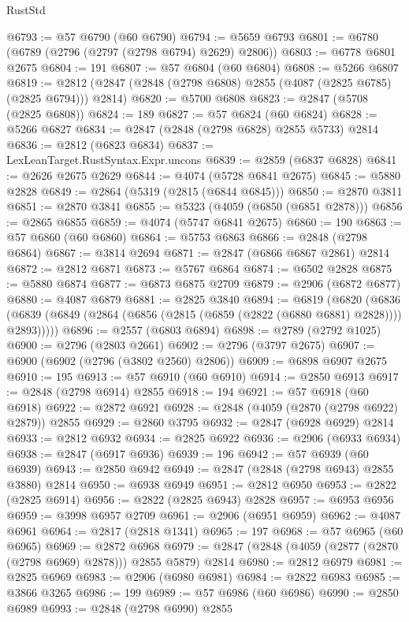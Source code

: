 \begin{lexlean}{RustStd}
\begin{coremodule}
@6793 := @57 @6790 (@60 @6790)
@6794 := @5659 @6793
@6801 := @6780 (@6789 (@2796 (@2797 (@2798 @6794) @2629) @2806))
@6803 := @6778 @6801 @2675
@6804 := 191
@6807 := @57 @6804 (@60 @6804)
@6808 := @5266 @6807
@6819 := @2812 (@2847 (@2848 (@2798 @6808) @2855 (@4087 (@2825 @6785) (@2825 @6794))) @2814)
@6820 := @5700 @6808
@6823 := @2847 (@5708 (@2825 @6808))
@6824 := 189
@6827 := @57 @6824 (@60 @6824)
@6828 := @5266 @6827
@6834 := @2847 (@2848 (@2798 @6828) @2855 @5733) @2814
@6836 := @2812 (@6823 @6834)
@6837 := LexLeanTarget.RustSyntax.Expr.uncons
@6839 := @2859 (@6837 @6828)
@6841 := @2626 @2675 @2629
@6844 := @4074 (@5728 @6841 @2675)
@6845 := @5880 @2828
@6849 := @2864 (@5319 (@2815 (@6844 @6845)))
@6850 := @2870 @3811
@6851 := @2870 @3841
@6855 := @5323 (@4059 (@6850 (@6851 @2878)))
@6856 := @2865 @6855
@6859 := @4074 (@5747 @6841 @2675)
@6860 := 190
@6863 := @57 @6860 (@60 @6860)
@6864 := @5753 @6863
@6866 := @2848 (@2798 @6864)
@6867 := @3814 @2694
@6871 := @2847 (@6866 @6867 @2861) @2814
@6872 := @2812 @6871
@6873 := @5767 @6864
@6874 := @6502 @2828
@6875 := @5880 @6874
@6877 := @6873 @6875 @2709
@6879 := @2906 (@6872 @6877)
@6880 := @4087 @6879
@6881 := @2825 @3840
@6894 := @6819
    (@6820
      (@6836 (@6839 (@6849 (@2864 (@6856 (@2815 (@6859 (@2822 (@6880 @6881) @2828)))) @2893)))))
@6896 := @2557 (@6803 @6894)
@6898 := @2789 (@2792 @1025)
@6900 := @2796 (@2803 @2661)
@6902 := @2796 (@3797 @2675)
@6907 := @6900 (@6902 (@2796 (@3802 @2560) @2806))
@6909 := @6898 @6907 @2675
@6910 := 195
@6913 := @57 @6910 (@60 @6910)
@6914 := @2850 @6913
@6917 := @2848 (@2798 @6914) @2855
@6918 := 194
@6921 := @57 @6918 (@60 @6918)
@6922 := @2872 @6921
@6928 := @2848 (@4059 (@2870 (@2798 @6922) @2879)) @2855
@6929 := @2860 @3795
@6932 := @2847 (@6928 @6929) @2814
@6933 := @2812 @6932
@6934 := @2825 @6922
@6936 := @2906 (@6933 @6934)
@6938 := @2847 (@6917 @6936)
@6939 := 196
@6942 := @57 @6939 (@60 @6939)
@6943 := @2850 @6942
@6949 := @2847 (@2848 (@2798 @6943) @2855 @3880) @2814
@6950 := @6938 @6949
@6951 := @2812 @6950
@6953 := @2822 (@2825 @6914)
@6956 := @2822 (@2825 @6943) @2828
@6957 := @6953 @6956
@6959 := @3998 @6957 @2709
@6961 := @2906 (@6951 @6959)
@6962 := @4087 @6961
@6964 := @2817 (@2818 @1341)
@6965 := 197
@6968 := @57 @6965 (@60 @6965)
@6969 := @2872 @6968
@6979 := @2847 (@2848 (@4059 (@2877 (@2870 (@2798 @6969) @2878))) @2855 @5879) @2814
@6980 := @2812 @6979
@6981 := @2825 @6969
@6983 := @2906 (@6980 @6981)
@6984 := @2822 @6983
@6985 := @3866 @3265
@6986 := 199
@6989 := @57 @6986 (@60 @6986)
@6990 := @2850 @6989
@6993 := @2848 (@2798 @6990) @2855

\end{coremodule}
\end{lexlean}
